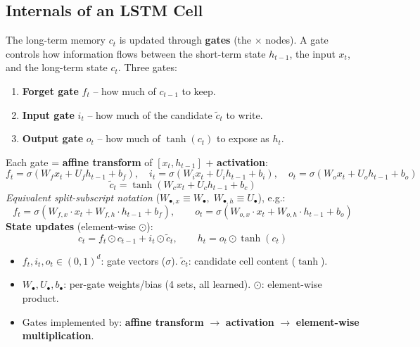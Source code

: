\documentclass[10pt,a4paper]{article}
\begin{document}
	\subsection{Internals of an LSTM Cell}

	\begin{definitionbox}
		The long-term memory $c_t$ is updated through \textbf{gates} (the $\times$ nodes). A gate controls how information flows between the short-term state $h_{t-1}$, the input $x_t$, and the long-term state $c_t$. Three gates:
		\begin{enumerate}[leftmargin=*, nosep]
			\item \textbf{Forget gate} $f_t$ -- how much of $c_{t-1}$ to keep.
			\item \textbf{Input gate} $i_t$ -- how much of the candidate $\tilde c_t$ to write.
			\item \textbf{Output gate} $o_t$ -- how much of $\tanh(c_t)$ to expose as $h_t$.
		\end{enumerate}
	\end{definitionbox}

	\begin{formulabox}
		Each gate = \textbf{affine transform} of $[x_t, h_{t-1}]$ + \textbf{activation}:
		\[
		f_t = \sigma(W_f x_t + U_f h_{t-1} + b_f),\quad
		i_t = \sigma(W_i x_t + U_i h_{t-1} + b_i),\quad
		o_t = \sigma(W_o x_t + U_o h_{t-1} + b_o)
		\]
		\[
		\tilde c_t = \tanh(W_c x_t + U_c h_{t-1} + b_c)
		\]
		\textit{Equivalent split-subscript notation} ($W_{\bullet,x}\equiv W_\bullet,\; W_{\bullet,h}\equiv U_\bullet$), e.g.:
		\[
		f_t = \sigma\!\left(W_{f,x}\cdot x_t + W_{f,h}\cdot h_{t-1} + b_f\right),\qquad
		o_t = \sigma\!\left(W_{o,x}\cdot x_t + W_{o,h}\cdot h_{t-1} + b_o\right)
		\]
		\textbf{State updates} (element-wise $\odot$):
		\[
		c_t = f_t \odot c_{t-1} + i_t \odot \tilde c_t,
		\qquad
		h_t = o_t \odot \tanh(c_t)
		\]
	\end{formulabox}
	\begin{itemize}[leftmargin=*]
		\item $f_t, i_t, o_t \in (0,1)^d$: gate vectors ($\sigma$). \quad $\tilde c_t$: candidate cell content ($\tanh$).
		\item $W_\bullet, U_\bullet, b_\bullet$: per-gate weights/bias (4 sets, all learned). \quad $\odot$: element-wise product.
		\item Gates implemented by: \textbf{affine transform} $\to$ \textbf{activation} $\to$ \textbf{element-wise multiplication}.
	\end{itemize}
\end{document}
